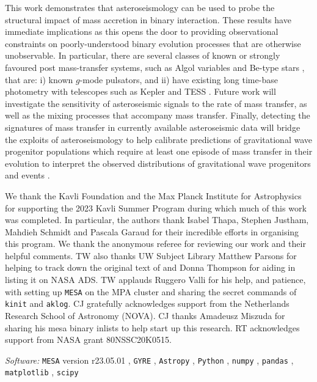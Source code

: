 \documentclass[desactivate]{aa}
\begin{document}
This work demonstrates that asteroseismology can be used to probe the structural impact of mass accretion in binary interaction. These results have immediate implications as this opens the door to providing observational constraints on poorly-understood binary evolution processes that are otherwise unobservable. In particular, there are several classes of known or strongly favoured post mass-transfer systems, such as Algol variables \citep[e.g. ][]{Shi2022} and Be-type stars \citep[e.g.][]{Baade1982,Bodensteiner+2020,LabadieBartz2022}, that are: i) known $g$-mode pulsators, and ii) have existing long time-base photometry with telescopes such as Kepler \citep{Borucki+2010} and TESS \citep{Ricker+2015}. Future work will investigate the sensitivity of asteroseismic signals to the rate of mass transfer, as well as the mixing processes that accompany mass transfer. Finally, detecting the signatures of mass transfer in currently available asteroseismic data will bridge the exploits of asteroseismology to help calibrate predictions of gravitational wave progenitor populations which require at least one episode of mass transfer in their evolution to interpret the observed distributions of gravitational wave progenitors and events \citep{Abbott+2023,Renzo+2023}.

\begin{acknowledgements}
    We thank the Kavli Foundation and the Max Planck Institute for Astrophysics for supporting the 2023 Kavli Summer Program during which much of this work was completed. In particular, the authors thank Isabel Thapa, Stephen Justham, Mahdieh Schmidt and Pascala Garaud for their incredible efforts in organising this program. We thank the anonymous referee for reviewing our work and their helpful comments. TW also thanks UW Subject Library Matthew Parsons for helping to track down the original text of \citet{BVF-vaisala} and Donna Thompson for aiding in listing it on NASA ADS. TW applauds Ruggero Valli for his help, and patience, with setting up \texttt{MESA} on the MPA cluster and sharing the secret commands of \texttt{kinit} and \texttt{aklog}. CJ gratefully acknowledges support from the Netherlands Research School of Astronomy (NOVA). CJ thanks Amadeusz Miszuda for sharing his {\sc mesa} {\sc binary} inlists to help start up this research. RT acknowledges support from NASA grant 80NSSC20K0515.
\end{acknowledgements}

\textit{Software:} \texttt{MESA} \citep{Paxton2011, Paxton2013, Paxton2015, Paxton2018, Paxton2019, Jermyn2023} version r23.05.01 \citep{mesa_zenodo}, \texttt{GYRE} \citep{Townsend+2013, Townsend+2018}, \texttt{Astropy} \citep{astropy:2013, astropy:2018, astropy:2022}, \texttt{Python} \citep{python}, \texttt{numpy} \citep{numpy}, \texttt{pandas} \citep{pandas_1.4.2, pandas_paper}, \texttt{matplotlib} \citep{matplotlib}, \texttt{scipy} \citep{Virtanen+2020}
\end{document}
